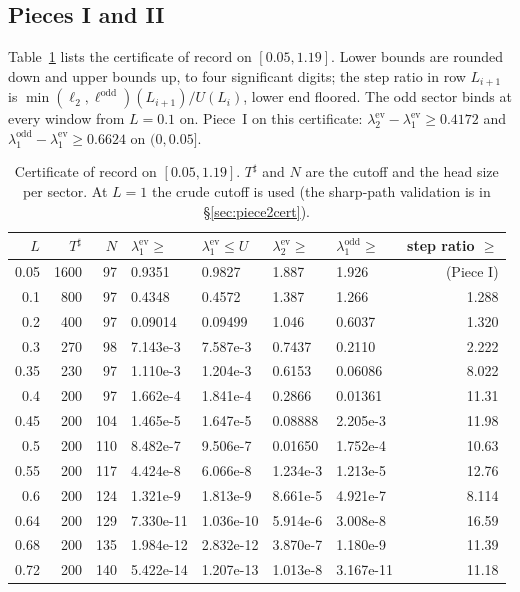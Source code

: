\documentclass[11pt]{amsart}
\newcommand{\ev}{\mathrm{ev}}
\newcommand{\od}{\mathrm{odd}}
\newcommand{\Tsh}{T^{\sharp}}
\theoremstyle{definition}
\theoremstyle{remark}
\numberwithin{equation}{section}
\begin{document}
\subsection{Pieces I and II}
Table~\ref{tab:piece2} lists the certificate of record on $[0.05,1.19]$. Lower bounds are rounded down and upper bounds up, to four significant digits; the step ratio in row $L_{i+1}$ is $\min(\ell_2,\ell^\od)(L_{i+1})/U(L_i)$, lower end floored. The odd sector binds at every window from $L=0.1$ on. Piece~I on this certificate: $\lambda_2^\ev-\lambda_1^\ev\ge0.4172$ and $\lambda_1^\od-\lambda_1^\ev\ge0.6624$ on $(0,0.05]$.

\begin{table}[ht]
\centering\footnotesize
\caption{Certificate of record on $[0.05,1.19]$. $\Tsh$ and $N$ are the cutoff and the head size per sector. At $L=1$ the crude cutoff is used (the sharp-path validation is in \S\ref{sec:piece2cert}).}\label{tab:piece2}
\begin{tabular}{rrrllllr}
\toprule
$L$ & $\Tsh$ & $N$ & $\lambda_1^\ev\ge$ & $\lambda_1^\ev\le U$ & $\lambda_2^\ev\ge$ & $\lambda_1^\od\ge$ & step ratio $\ge$\\
\midrule
0.05 & 1600 & 97 & 0.9351 & 0.9827 & 1.887 & 1.926 & (Piece I)\\
0.1 & 800 & 97 & 0.4348 & 0.4572 & 1.387 & 1.266 & 1.288\\
0.2 & 400 & 97 & 0.09014 & 0.09499 & 1.046 & 0.6037 & 1.320\\
0.3 & 270 & 98 & 7.143e-3 & 7.587e-3 & 0.7437 & 0.2110 & 2.222\\
0.35 & 230 & 97 & 1.110e-3 & 1.204e-3 & 0.6153 & 0.06086 & 8.022\\
0.4 & 200 & 97 & 1.662e-4 & 1.841e-4 & 0.2866 & 0.01361 & 11.31\\
0.45 & 200 & 104 & 1.465e-5 & 1.647e-5 & 0.08888 & 2.205e-3 & 11.98\\
0.5 & 200 & 110 & 8.482e-7 & 9.506e-7 & 0.01650 & 1.752e-4 & 10.63\\
0.55 & 200 & 117 & 4.424e-8 & 6.066e-8 & 1.234e-3 & 1.213e-5 & 12.76\\
0.6 & 200 & 124 & 1.321e-9 & 1.813e-9 & 8.661e-5 & 4.921e-7 & 8.114\\
0.64 & 200 & 129 & 7.330e-11 & 1.036e-10 & 5.914e-6 & 3.008e-8 & 16.59\\
0.68 & 200 & 135 & 1.984e-12 & 2.832e-12 & 3.870e-7 & 1.180e-9 & 11.39\\
0.72 & 200 & 140 & 5.422e-14 & 1.207e-13 & 1.013e-8 & 3.167e-11 & 11.18\\

\end{tabular}
\end{table}
\end{document}
